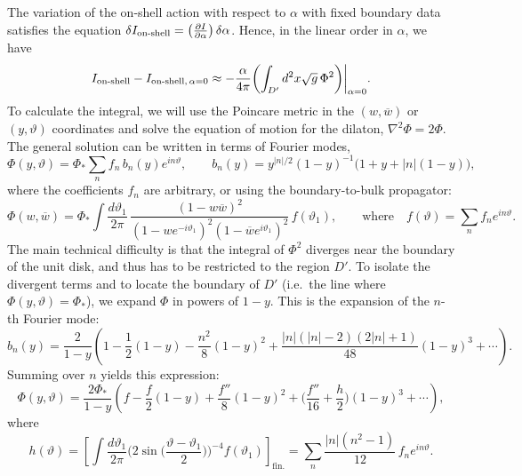 \documentclass[12pt]{article}
\newcommand{\al}{\alpha}
\newcommand{\de}{\delta}
\newcommand{\vt}{\vartheta}
\newcommand{\wc}{\overline{w}}
\def\ie{i.e.\ }
\newcommand{\ov}{\over}
\newcommand{\p}{\partial}
\begin{document}
The variation of the on-shell action with respect to $\alpha$ with fixed boundary data satisfies the equation $\delta I_{\text{on-shell}}=\left({\p I \over \p \alpha}\right)\de \alpha$. Hence, in the linear order in $\alpha$, we have
\begin{equation} \label{osdilact}
I_{\text{on-shell}}-I_{\text{on-shell},\,\alpha=0}
\approx -{\al \ov 4 \pi}\biggl(\int_{D'} d^2x \sqrt{g}\,
\Phi^2\biggr)\bigg|_{\alpha=0}.
\end{equation}
To calculate the integral, we will use the Poincare metric in the $(w,\wc)$ or $(y,\vt)$ coordinates and solve the equation of motion for the dilaton, $\nabla^2\Phi=2\Phi$. The general solution can be written in terms of Fourier modes,
\begin{equation}\label{Phi_fm}
\Phi(y, \vt)=\Phi_* \sum_{n} f_{n}\,b_{n}(y)e^{in\vt},\qquad
b_n(y)=y^{|n|/2}(1-y)^{-1}\bigl(1+y+|n|(1-y)\bigr),
\end{equation}
where the coefficients $f_n$ are arbitrary, or using the boundary-to-bulk propagator:
\begin{equation}\label{Phi_bbprop}
\Phi(w, \wc)=\Phi_*\int\frac{d\vt_1}{2\pi}\,
\frac{(1-w\wc)^2}{(1-we^{-i\vt_1})^2(1-\wc e^{i\vt_1})^2}\,f(\vt_1),\qquad
\text{where}\quad
f(\vt)=\sum_{n} f_{n}e^{in\vt}.
\end{equation}
The main technical difficulty is that the integral of $\Phi^2$ diverges near the boundary of the unit disk, and thus has to be restricted to the region $D'$. To isolate the divergent terms and to locate the boundary of $D'$ (\ie the line where $\Phi(y,\vt)=\Phi_*$), we expand $\Phi$ in powers of $1-y$. This is the expansion of the $n$-th Fourier mode:
\begin{equation}\label{bulk_modes}
b_n(y)=\frac{2}{1-y}\left(
1-\frac{1}{2}(1-y)-\frac{n^2}{8}(1-y)^2
+\frac{|n|(|n|-2)(2|n|+1)}{48}(1-y)^3+\cdots
\right).
\end{equation}
Summing over $n$ yields this expression:
\begin{equation}\label{Phi_expansion}
\Phi(y,\vt)=\frac{2\Phi_*}{1-y} \left(
f-\frac{f}{2}(1-y)+\frac{f''}{8}(1-y)^{2}
+\biggl(\frac{f''}{16}+\frac{h}{2}\biggr)(1-y)^{3}
+\cdots\right),
\end{equation}
where
\begin{equation}
h(\vt)=\left[\int\frac{d\vt_1}{2\pi}
\biggl(2\sin\biggl(\frac{\vt-\vt_1}{2}\biggr)\biggr)^{-4} f(\vt_1)
\right]_{\text{fin.}}
=\sum_{n}\frac{|n|(n^2-1)}{12}\,f_{n}e^{in\vt}.
\end{equation}
\end{document}
